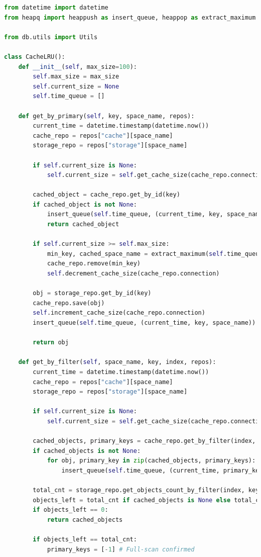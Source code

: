 \begin{lstlisting}[label=lst:cache, caption=Листинг модуля кэширования данных с политикой вытеснения LRU, language=python]
from datetime import datetime
from heapq import heappush as insert_queue, heappop as extract_maximum

from db.utils import Utils

class CacheLRU():
	def __init__(self, max_size=100):
		self.max_size = max_size
		self.current_size = None
		self.time_queue = []

	def get_by_primary(self, key, space_name, repos):
		current_time = datetime.timestamp(datetime.now())
		cache_repo = repos["cache"][space_name]
		storage_repo = repos["storage"][space_name]

		if self.current_size is None:
			self.current_size = self.get_cache_size(cache_repo.connection)

		cached_object = cache_repo.get_by_id(key)
		if cached_object is not None:
			insert_queue(self.time_queue, (current_time, key, space_name))
			return cached_object

		if self.current_size >= self.max_size:
			min_key, cached_space_name = extract_maximum(self.time_queue)[1:]
			cache_repo.remove(min_key)
			self.decrement_cache_size(cache_repo.connection)

		obj = storage_repo.get_by_id(key)
		cache_repo.save(obj)
		self.increment_cache_size(cache_repo.connection)
		insert_queue(self.time_queue, (current_time, key, space_name))

		return obj

	def get_by_filter(self, space_name, key, index, repos):
		current_time = datetime.timestamp(datetime.now())
		cache_repo = repos["cache"][space_name]
		storage_repo = repos["storage"][space_name]

		if self.current_size is None:
			self.current_size = self.get_cache_size(cache_repo.connection)

		cached_objects, primary_keys = cache_repo.get_by_filter(index, key)
		if cached_objects is not None:
			for obj, primary_key in zip(cached_objects, primary_keys):
				insert_queue(self.time_queue, (current_time, primary_key, space_name))

		total_cnt = storage_repo.get_objects_count_by_filter(index, key)
		objects_left = total_cnt if cached_objects is None else total_cnt - len(cached_objects)
		if objects_left == 0:
			return cached_objects

		if objects_left == total_cnt:
			primary_keys = [-1] # Full-scan confirmed


\end{lstlisting}
